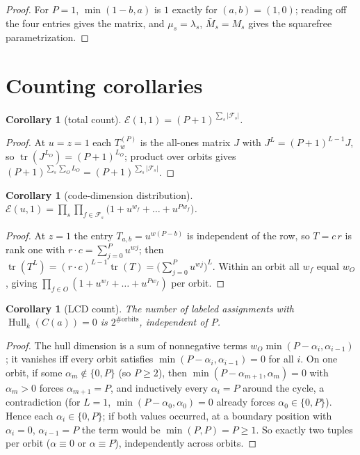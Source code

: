 \documentclass[11pt]{article}
\newtheorem{corollary}[theorem]{Corollary}
\theoremstyle{definition}
\theoremstyle{remark}
\newcommand{\Hull}{\operatorname{Hull}}
\newcommand{\tr}{\operatorname{tr}}
\begin{document}
\begin{proof}
For \(P=1\), \(\min(1-b, a)\) is \(1\) exactly for \((a,b) = (1,0)\);
reading off the four entries gives the matrix, and \(\mu_s = \lambda_s\),
\(\bar M_s = M_s\) gives the squarefree parametrization.
\end{proof}

\section{Counting corollaries}\label{sec:corollaries}

\begin{corollary}[total count]\label{cor:C1}
\(\mathcal{E}(1,1) = (P+1)^{\sum_s |\mathcal{F}_s|}\).
\end{corollary}

\begin{proof}
At \(u=z=1\) each \(T^{(P)}_w\) is the all-ones matrix \(J\) with
\(J^L = (P+1)^{L-1} J\), so \(\tr(J^{L_O}) = (P+1)^{L_O}\); product over
orbits gives \((P+1)^{\sum_s \sum_O L_O} = (P+1)^{\sum_s |\mathcal{F}_s|}\).
\end{proof}

\begin{corollary}[code-dimension distribution]\label{cor:C2}
\(\displaystyle
\mathcal{E}(u,1) = \prod_{s} \prod_{f \in \mathcal{F}_s}
\big(1 + u^{w_f} + \dots + u^{P w_f}\big)\).
\end{corollary}

\begin{proof}
At \(z=1\) the entry \(T_{a,b} = u^{w(P-b)}\) is independent of the row,
so \(T = c\,r\) is rank one with \(r \cdot c = \sum_{j=0}^{P} u^{wj}\);
then \(\tr(T^L) = (r\cdot c)^{L-1} \tr(T) = \big(\sum_{j=0}^P u^{wj}\big)^L\).
Within an orbit all \(w_f\) equal \(w_O\), giving
\(\prod_{f \in O} (1 + u^{w_f} + \dots + u^{Pw_f})\) per orbit.
\end{proof}

\begin{corollary}[LCD count]\label{cor:C3}
The number of labeled assignments with \(\Hull_k(C(a)) = 0\) is
\(2^{\#\text{orbits}}\), independent of \(P\).
\end{corollary}

\begin{proof}
The hull dimension is a sum of nonnegative terms
\(w_O \min(P-\alpha_i, \alpha_{i-1})\); it vanishes iff every orbit
satisfies \(\min(P-\alpha_i, \alpha_{i-1}) = 0\) for all \(i\). On one
orbit, if some \(\alpha_m \notin \{0,P\}\) (so \(P \ge 2\)), then
\(\min(P-\alpha_{m+1}, \alpha_m) = 0\) with \(\alpha_m > 0\) forces
\(\alpha_{m+1} = P\), and inductively every \(\alpha_i = P\) around the
cycle, a contradiction (for \(L=1\), \(\min(P-\alpha_0,\alpha_0) = 0\)
already forces \(\alpha_0 \in \{0,P\}\)). Hence each \(\alpha_i \in
\{0,P\}\); if both values occurred, at a boundary position with
\(\alpha_i = 0\), \(\alpha_{i-1} = P\) the term would be
\(\min(P,P) = P \ge 1\). So exactly two tuples per orbit
(\(\alpha \equiv 0\) or \(\alpha \equiv P\)), independently across
orbits.
\end{proof}
\end{document}
